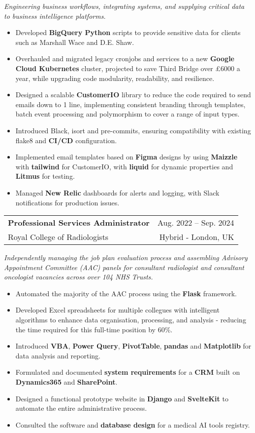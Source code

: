 \documentclass[letterpaper,11pt]{article}
\makeatletter
\newcommand{\resumeItem}[1]{
  \item\small{
    {#1 \vspace{-2pt}}
  }
}
\newcommand{\resumeSubtitle}[1]{
  \vspace{5pt}
  \small{
      \textit{#1 \vspace{-7pt}}
  }
}
\newcommand{\resumeSubheading}[4]{
  \vspace{-2pt}\item
    \begin{tabular*}{0.97\textwidth}[t]{l@{\extracolsep{\fill}}r}
      \textbf{#1} & #2 \\
      {\small#3} & {\small #4} \\
    \end{tabular*}\vspace{-7pt}
}
\newcommand{\resumeItemListStart}{\begin{itemize}}
\newcommand{\resumeItemListEnd}{\end{itemize}\vspace{-5pt}}
\makeatother
\begin{document}
      \resumeSubtitle{Engineering business workflows, integrating systems, and supplying critical data to business intelligence platforms.}
      \resumeItemListStart
\resumeItem{Developed \textbf{BigQuery Python} scripts to provide sensitive data for clients such as Marshall Wace and D.E. Shaw.}
\resumeItem{Overhauled and migrated legacy cronjobs and services to a new \textbf{Google Cloud Kubernetes} cluster, projected to save Third Bridge over £6000 a year, while upgrading code modularity, readability, and resilience.}
\resumeItem{Designed a scalable \textbf{CustomerIO} library to reduce the code required to send emails down to 1 line, implementing consistent branding through templates, batch event processing and polymorphism to cover a range of input types.}
\resumeItem{Introduced Black, isort and pre-commits, ensuring compatibility with existing flake8 and \textbf{CI/CD} configuration.}
\resumeItem{Implemented email templates based on \textbf{Figma} designs by using \textbf{Maizzle} with \textbf{tailwind} for CustomerIO, with \textbf{liquid} for dynamic properties and \textbf{Litmus} for testing.}
\resumeItem{Managed \textbf{New Relic} dashboards for alerts and logging, with Slack notifications for production issues.}
      \resumeItemListEnd
  
    \resumeSubheading
      {Professional Services Administrator}{Aug. 2022 -- Sep. 2024}
      {Royal College of Radiologists}{Hybrid - London, UK}
      
      \resumeSubtitle{Independently managing the job plan evaluation process and assembling Advisory Appointment Committee (AAC) panels for consultant radiologist and consultant oncologist vacancies across over 104 NHS Trusts.}
      \resumeItemListStart
\resumeItem{Automated the majority of the AAC process using the \textbf{Flask} framework.}
\resumeItem{Developed Excel spreadsheets for multiple collegues with intelligent algorithms to enhance data organisation, processing, and analysis - reducing the time required for this full-time position by 60\%.}
\resumeItem{Introduced \textbf{VBA}, \textbf{Power Query}, \textbf{PivotTable}, \textbf{pandas} and \textbf{Matplotlib} for data analysis and reporting.}
\resumeItem{Formulated and documented \textbf{system requirements} for a \textbf{CRM} built on \textbf{Dynamics365} and \textbf{SharePoint}.}
\resumeItem{Designed a functional prototype website in \textbf{Django} and \textbf{SvelteKit} to automate the entire administrative process.}
\resumeItem{Consulted the software and \textbf{database design} for a medical AI tools registry.}
      \resumeItemListEnd
      
\end{document}
